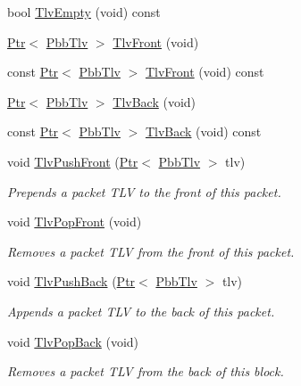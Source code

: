 \begin{DoxyCompactItemize}
\item 
bool \hyperlink{classns3_1_1PbbPacket_afc05204e82df389edaf180b678d8c3fd}{Tlv\+Empty} (void) const 
\item 
\hyperlink{classns3_1_1Ptr}{Ptr}$<$ \hyperlink{classns3_1_1PbbTlv}{Pbb\+Tlv} $>$ \hyperlink{classns3_1_1PbbPacket_a339301fec3d0873b3b0645d5bd6edc16}{Tlv\+Front} (void)
\item 
const \hyperlink{classns3_1_1Ptr}{Ptr}$<$ \hyperlink{classns3_1_1PbbTlv}{Pbb\+Tlv} $>$ \hyperlink{classns3_1_1PbbPacket_af267bd3abcd7df900a9fbaba5990d2ea}{Tlv\+Front} (void) const 
\item 
\hyperlink{classns3_1_1Ptr}{Ptr}$<$ \hyperlink{classns3_1_1PbbTlv}{Pbb\+Tlv} $>$ \hyperlink{classns3_1_1PbbPacket_a8e6eb2037c14c156fe1c2fbaf22fc014}{Tlv\+Back} (void)
\item 
const \hyperlink{classns3_1_1Ptr}{Ptr}$<$ \hyperlink{classns3_1_1PbbTlv}{Pbb\+Tlv} $>$ \hyperlink{classns3_1_1PbbPacket_a798f5ac6f2daf1a8403685d56cf82ec6}{Tlv\+Back} (void) const 
\item 
void \hyperlink{classns3_1_1PbbPacket_a82fa25c26b64b96b80a8ddfefe627d24}{Tlv\+Push\+Front} (\hyperlink{classns3_1_1Ptr}{Ptr}$<$ \hyperlink{classns3_1_1PbbTlv}{Pbb\+Tlv} $>$ tlv)
\begin{DoxyCompactList}\small\item\em Prepends a packet T\+LV to the front of this packet. \end{DoxyCompactList}\item 
void \hyperlink{classns3_1_1PbbPacket_a669c2a4157eb47523742874adb250b09}{Tlv\+Pop\+Front} (void)
\begin{DoxyCompactList}\small\item\em Removes a packet T\+LV from the front of this packet. \end{DoxyCompactList}\item 
void \hyperlink{classns3_1_1PbbPacket_a34935793e729a106c176db99c969cb42}{Tlv\+Push\+Back} (\hyperlink{classns3_1_1Ptr}{Ptr}$<$ \hyperlink{classns3_1_1PbbTlv}{Pbb\+Tlv} $>$ tlv)
\begin{DoxyCompactList}\small\item\em Appends a packet T\+LV to the back of this packet. \end{DoxyCompactList}\item 
void \hyperlink{classns3_1_1PbbPacket_a3162a7d66bb0f845c716fd89ed8c3afb}{Tlv\+Pop\+Back} (void)
\begin{DoxyCompactList}\small\item\em Removes a packet T\+LV from the back of this block. \end{DoxyCompactList}\item 

\end{DoxyCompactItemize}

